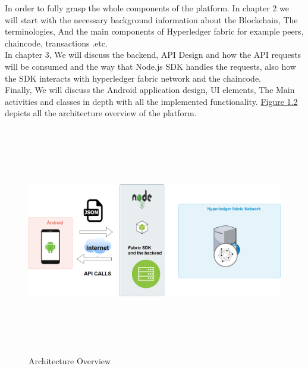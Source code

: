 \noindent In order to fully grasp the whole components of the platform. In chapter 2 we will start with the necessary background information about the Blockchain, The terminologies, And the main components of Hyperledger fabric for example peers, chaincode, transactions .etc. \\
In chapter 3, We will discuss the backend, API Design and how the API requests will be consumed and the way that Node.js SDK handles the requests, also how the SDK interacts with hyperledger fabric network and the chaincode. \\
Finally, We will discuss the Android application design, UI elements, The Main activities and classes in depth with all the implemented functionality. \hyperref[fig:architecture]{Figure 1.2} depicts all the architecture overview of the platform. 
\begin{figure}[H]
	\includegraphics[width=15cm,height=10cm]{images/architecture.png}
	\caption{Architecture Overview}
	\label{fig:architecture}
	\end{figure}

      

 


      